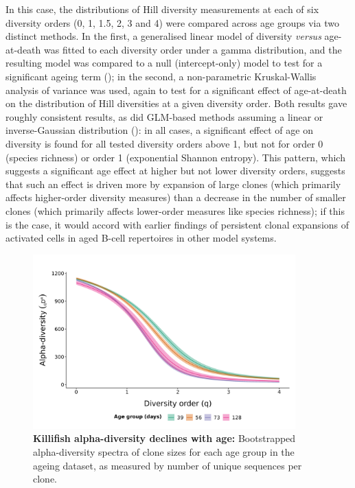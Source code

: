 In this case, the distributions of Hill diversity measurements at each of six diversity orders (0, 1, 1.5, 2, 3 and 4) were compared across age groups via two distinct methods. In the first, a generalised linear model of diversity \textit{versus} age-at-death was fitted to each diversity order under a gamma distribution, and the resulting model was compared to a null (intercept-only) model to test for a significant ageing term (); in the second, a non-parametric Kruskal-Wallis analysis of variance was used, again to test for a significant effect of age-at-death on the distribution of Hill diversities at a given diversity order. Both results gave roughly consistent results, as did GLM-based methods assuming a linear or inverse-Gaussian distribution (): in all cases, a significant effect of age on diversity is found for all tested diversity orders above 1, but not for order 0 (species richness) or order 1 (exponential Shannon entropy). This pattern, which suggests a significant age effect at higher but not lower diversity orders, suggests that such an effect is driven more by expansion of large clones (which primarily affects higher-order diversity measures) than a decrease in the number of smaller clones (which primarily affects lower-order measures like species richness); if this is the case, it would accord with earlier findings of persistent clonal expansions of activated cells in aged B-cell repertoires in other model systems. %

\begin{figure}
\centering
\includegraphics[width = 0.9\textwidth]{_Figures/png/ageing-clone-diversity-alpha}
\caption{\textbf{Killifish alpha-diversity declines with age:} Bootstrapped alpha-diversity spectra of clone sizes for each age group in the \igseq ageing dataset, as measured by number of unique sequences per clone.}
\label{fig:igseq-ageing-clone-diversity-alpha}
\end{figure}

